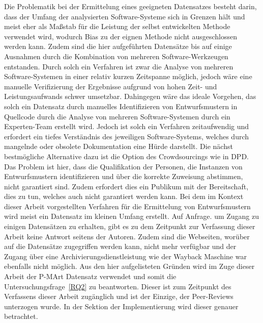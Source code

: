 Die Problematik bei der Ermittelung eines geeigneten Datensatzes besteht darin, dass der Umfang der analysierten Software-Systeme sich in Grenzen hält und meist eher als Maßstab für die Leistung der selbst entwickelten Methode verwendet wird, wodurch Bias zu der eignen Methode nicht ausgeschlossen werden kann.
Zudem sind die hier aufgeführten Datensätze bis auf einige Ausnahmen durch die Kombination von mehreren Software-Werkzeugen entstanden. Durch solch ein Verfahren ist zwar die Analyse von mehreren Software-Systemen in einer relativ kurzen Zeitspanne möglich, jedoch wäre eine manuelle Verifizierung der Ergebnisse aufgrund von hohen Zeit- und Leistungsaufwands schwer umsetzbar.
Dahingegen wäre das ideale Vorgehen, das solch ein Datensatz durch manuelles Identifizieren von Entwurfsmustern in Quellcode durch die Analyse von mehreren Software-Systemen durch ein Experten-Team erstellt wird. Jedoch ist solch ein Verfahren zeitaufwendig und erfordert ein tiefes Verständnis des jeweiligen Software-Systems, welches durch mangelnde oder obsolete Dokumentation eine Hürde darstellt.
Die nächst bestmögliche Alternative dazu ist die Option des Crowdsourcings wie in DPD. Das Problem ist hier, dass die Qualifikation der Personen, die Instanzen von Entwurfsmustern identifizieren und über die korrekte Zuweisung abstimmen, nicht garantiert sind. Zudem erfordert dies ein Publikum mit der Bereitschaft, dies zu tun, welches auch nicht garantiert werden kann.
Bei dem im Kontext dieser Arbeit vorgestellten Verfahren für die Ermittelung von Entwurfsmustern wird meist ein Datensatz im kleinen Umfang erstellt. Auf Anfrage. um Zugang zu einigen Datensätzen zu erhalten, gibt es zu dem Zeitpunkt zur Verfassung dieser Arbeit keine Antwort seitens der Autoren. Zudem sind die Webseiten, worüber auf die Datensätze zugegriffen werden kann, nicht mehr verfügbar und der Zugang über eine Archivierungsdienstleistung wie der Wayback Maschine war ebenfalls nicht möglich. 
Aus den hier aufgelisteten Gründen wird im Zuge dieser Arbeit der P-MArt Datensatz verwendet und somit die Untersuchungsfrage~\ref{RQ2} zu beantworten. Dieser ist zum Zeitpunkt des Verfassens dieser Arbeit zugänglich und ist der Einzige, der Peer-Reviews unterzogen wurde. In der Sektion der Implementierung wird dieser genauer betrachtet.